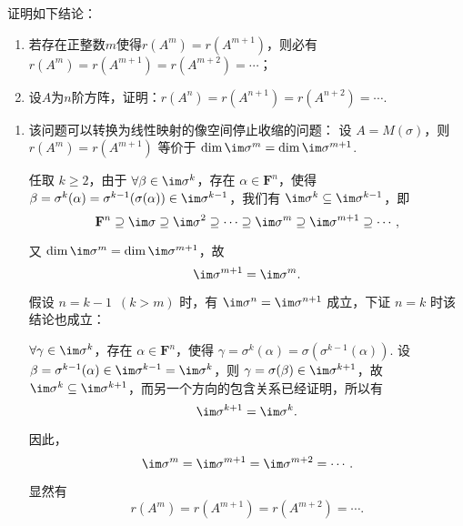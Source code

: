 \begin{exercise}
\begin{exgroup}
        \item 证明如下结论：
        \begin{enumerate}
            \item 若存在正整数$m$使得$r(A^m)=r(A^{m+1})$，则必有$r(A^m)=r(A^{m+1})=r(A^{m+2})=\cdots$；
            \item 设$A$为$n$阶方阵，证明：$r(A^n)=r(A^{n+1})=r(A^{n+2})=\cdots$.
        \end{enumerate}
        \begin{answer}
            \begin{enumerate}
                \item 该问题可以转换为线性映射的像空间停止收缩的问题：
                    设 $A = M(\sigma)$，则 $r(A^m) = r(A^{m+1})$ 等价于 $\dim \im \sigma^m = \dim \im \sigma^{m+1}$.

                    任取 $k \geqslant 2$，由于 $\forall \beta \in \im \sigma^k$，存在 $\alpha \in \mathbf{F}^n$，使得 $\beta = \sigma^k(\alpha) = \sigma^{k-1}(\sigma(\alpha)) \in \im \sigma^{k-1}$，我们有 $\im \sigma^k \subseteq \im \sigma^{k-1}$，即
                    \[
                        \mathbf{F}^n \supseteq \im \sigma \supseteq \im \sigma^2 \supseteq \cdots \supseteq \im \sigma^m \supseteq \im \sigma^{m+1} \supseteq \cdots,
                    \]

                    又 $\dim \im \sigma^m = \dim \im \sigma^{m+1}$，故
                    \[
                        \im \sigma^{m+1} = \im \sigma^m.
                    \]

                    假设 $n=k-1 \enspace (k > m)$ 时，有 $\im \sigma^n = \im \sigma^{n+1}$ 成立，下证 $n=k$ 时该结论也成立：

                    $\forall \gamma \in \im \sigma^k$，存在 $\alpha \in \mathbf{F}^n$，使得 $\gamma = \sigma^k(\alpha) = \sigma(\sigma^{k-1}(\alpha))$. 设 $\beta = \sigma^{k-1}(\alpha) \in \im \sigma^{k-1} = \im \sigma^k$，则 $\gamma = \sigma(\beta) \in \im \sigma^{k+1}$，故 $\im \sigma^k \subseteq \im \sigma^{k+1}$，而另一个方向的包含关系已经证明，所以有
                    \[
                        \im \sigma^{k+1} = \im \sigma^k.
                    \]

                    因此，
                    \[
                        \im \sigma^m = \im \sigma^{m+1} = \im \sigma^{m+2} = \cdots.
                    \]

                    显然有
                    \[
                        r(A^m) = r(A^{m+1}) = r(A^{m+2}) = \cdots.
                    \]


\end{enumerate}
\end{answer}
\end{exgroup}
\end{exercise}
